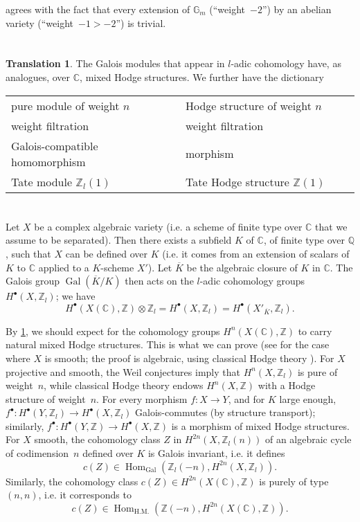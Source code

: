 \documentclass{article}
\theoremstyle{plain}
\theoremstyle{definition}
\newtheorem*{translation*}{Translation}
\newcommand{\ZZ}{\mathbb{Z}}
\newcommand{\QQ}{\mathbb{Q}}
\newcommand{\CC}{\mathbb{C}}
\DeclareMathOperator{\Gal}{Gal}
\DeclareMathOperator{\Hom}{Hom}
\newcommand{\oldpage}[1]{\marginpar{\footnotesize$\Big\vert$ \textit{p.~#1}}}
\begin{document}
 agrees with the fact that every extension of $\mathbb{G}_m$ (``weight~$-2$'') by an abelian variety (``weight~$-1>-2$'') is trivial.


\section{}
\label{3}

\begin{translation*}
  The Galois modules that appear in $l$-adic cohomology have, as analogues, over $\CC$, mixed Hodge structures.
  We further have the dictionary
  
  \bigskip
  \begin{tabular}{p{0.5\linewidth}|p{0.5\linewidth}}
    pure module of weight $n$
    & Hodge structure of weight $n$
  \\weight filtration
    & weight filtration
  \\Galois-compatible homomorphism
    & morphism
  \\Tate module $\ZZ_l(1)$
    & Tate Hodge structure $\ZZ(1)$
  \end{tabular}
\end{translation*}


\section{}
\label{4}

Let $X$ be a complex algebraic variety (i.e. a scheme of finite type over $\CC$ that we assume to be separated).
Then there exists a subfield $K$ of $\CC$, of finite type over $\QQ$, such that $X$ can be defined over $K$ (i.e. it comes from an extension of scalars of $K$ to $\CC$ applied to a $K$-scheme $X'$).
Let $\overline{K}$ be the algebraic closure of $K$ in $\CC$.
The Galois group $\Gal(\overline{K}/K)$ then acts on the $l$-adic cohomology groups $H^\bullet(X,\ZZ_l)$;
we have
\[
  H^\bullet(X(\CC),\ZZ)\otimes\ZZ_l
  = H^\bullet(X,\ZZ_l)
  = H^\bullet(X'_{\overline{K}},\ZZ_l).
\]

\oldpage{427}
By \cref{3}, we should expect for the cohomology groups $H^n(X(\CC),\ZZ)$ to carry natural mixed Hodge structures.
This is what we can prove (see \cite[3.2.5]{1} for the case where $X$ is smooth; the proof is algebraic, using classical Hodge theory \cite{6}).
For $X$ projective and smooth, the Weil conjectures imply that $H^n(X,\ZZ_l)$ is pure of weight~$n$, while classical Hodge theory endows $H^n(X,\ZZ)$ with a Hodge structure of weight~$n$.
For every morphism $f\colon X\to Y$, and for $K$ large enough, $f^\bullet\colon H^\bullet(Y,\ZZ_l)\to H^\bullet(X,\ZZ_l)$ Galois-commutes (by structure transport);
similarly, $f^\bullet\colon H^\bullet(Y,\ZZ)\to H^\bullet(X,\ZZ)$ is a morphism of mixed Hodge structures.
For $X$ smooth, the cohomology class $Z$ in $H^{2n}(X,\ZZ_l(n))$ of an algebraic cycle of codimension~$n$ defined over $K$ is Galois invariant, i.e. it defines
\[
  c(Z) \in \Hom_{\Gal}(\ZZ_l(-n),H^{2n}(X,\ZZ_l)).
\]
Similarly, the cohomology class $c(Z)\in H^{2n}(X(\CC),\ZZ)$ is purely of type~$(n,n)$, i.e. it corresponds to
\[
  c(Z) \in \Hom_{\mathrm{H.M.}}(\ZZ(-n),H^{2n}(X(\CC),\ZZ)).
\]
\end{document}

